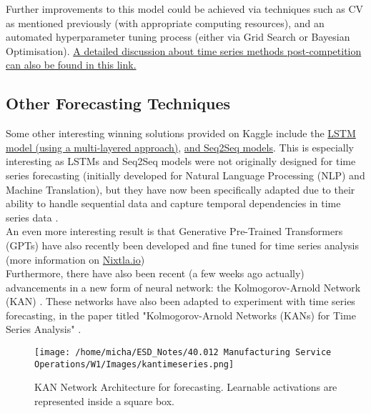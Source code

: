 \documentclass[12pt]{article}
\begin{document}
\noindent Further improvements to this model could be achieved via techniques such as CV as mentioned previously (with appropriate computing resources), and an automated hyperparameter tuning process (either via Grid Search or Bayesian Optimisation). \href{https://www.kaggle.com/c/m5-forecasting-accuracy/discussion/166814}{A detailed discussion about time series methods post-competition can also be found in this link.}

\subsection*{Other Forecasting Techniques}

Some other interesting winning solutions provided on Kaggle include the \href{https://www.kaggle.com/code/omershect/learning-pytorch-lstm-deep-learning-with-m5-data}{LSTM model (using a multi-layered approach)}, \href{https://www.kaggle.com/code/omershect/learning-pytorch-seq2seq-with-m5-data-set}{and Seq2Seq models}. This is especially interesting as LSTMs and Seq2Seq models were not originally designed for time series forecasting (initially developed for Natural Language Processing (NLP) and Machine Translation), but they have now been specifically adapted due to their ability to handle sequential data and capture temporal dependencies in time series data \cite{Olah_2015}. \\ 

\noindent An even more interesting result is that Generative Pre-Trained Transformers (GPTs) have also recently been developed and fine tuned for time series analysis \cite{garza2023timegpt1} \cite{liao2024timegpt} (more information on \href{https://docs.nixtla.io/}{Nixtla.io}) \\

\noindent Furthermore, there have also been recent (a few weeks ago actually) advancements in a new form of neural network: the Kolmogorov-Arnold Network (KAN) \cite{liu2024kan}. These networks have also been adapted to experiment with time series forecasting, in the paper titled "Kolmogorov-Arnold Networks (KANs) for Time Series Analysis" \cite{vacarubio2024kolmogorovarnold}. 

\begin{figure}[H]
    \centering
    \texttt{[image: /home/micha/ESD\_Notes/40.012 Manufacturing Service Operations/W1/Images/kantimeseries.png]}
    \caption{KAN Network Architecture for forecasting. Learnable activations are represented inside a square box.}
    \label{fig:6-kannetwork}
\end{figure} 
\end{document}
